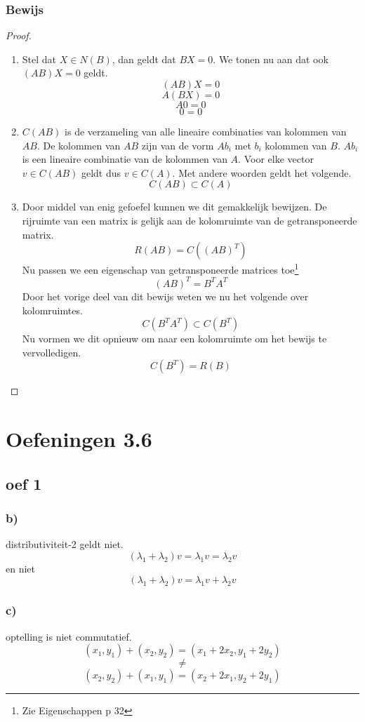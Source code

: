 \documentclass[lineaire_algebra_oplossingen.tex]{subfiles}
\begin{document}
\subsubsection*{Bewijs}
\begin{proof}
\begin{enumerate}
\item
Stel dat $X\in N(B)$, dan geldt dat $BX=0$. We tonen nu aan dat ook $(AB)X=0$ geldt.
\[(AB)X=0\]
\[A(BX)=0\]
\[A0=0\]
\[0=0\]
\item
$C(AB)$ is de verzameling van alle lineaire combinaties van kolommen van $AB$. De kolommen van $AB$ zijn van de vorm $Ab_i$ met $b_i$ kolommen van $B$. $Ab_i$ is een lineaire combinatie van de kolommen van $A$. Voor elke vector $v \in C(AB)$ geldt dus $v\in C(A)$. Met andere woorden geldt het volgende.
\[C(AB) \subset C(A)\]
\item
Door middel van enig gefoefel kunnen we dit gemakkelijk bewijzen.
De rijruimte van een matrix is gelijk aan de kolomruimte van de getransponeerde matrix.
\[
R(AB) = C((AB)^T)
\]
Nu passen we een eigenschap van getransponeerde matrices toe\footnote{Zie Eigenschappen p 32}
\[
(AB)^T = B^TA^T
\]
Door het vorige deel van dit bewijs weten we nu het volgende over kolomruimtes.
\[
C(B^TA^T) \subset C(B^T)
\]
Nu vormen we dit opnieuw om naar een kolomruimte om het bewijs te vervolledigen.
\[
C(B^T) = R(B)
\]
\end{enumerate}
\end{proof}

\section{Oefeningen 3.6}
\subsection{oef 1}
\subsubsection*{b)}
distributiviteit-2 geldt niet.
\[
(\lambda_1 + \lambda_2)v = \lambda_1v = \lambda_2v
\]
en niet
\[
(\lambda_1 + \lambda_2)v = \lambda_1v+\lambda_2v
\]

\subsubsection*{c)}
optelling is niet commutatief.
\[
(x_1,y_1) + (x_2,y_2) = (x_1+2x_2,y_1+2y_2)
\]
\[ \neq \]
\[
(x_2,y_2) + (x_1,y_1) = (x_2+2x_1,y_2+2y_1)
\]
\end{document}
